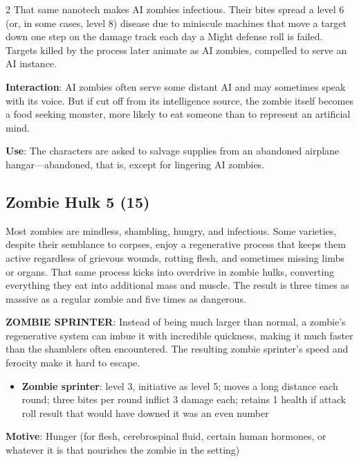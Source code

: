 \begin{multicols}{2}
That same nanotech makes AI zombies infectious. Their bites spread a level 6 (or, in some cases, level 8) disease due to miniscule machines that move a target down one step on the damage track each day a Might defense roll is failed. Targets killed by the process later animate as AI zombies, compelled to serve an AI instance. 

\textbf{Interaction}: AI zombies often serve some distant AI and may sometimes speak with its voice. But if cut off from its intelligence source, the zombie itself becomes a food seeking monster, more likely to eat someone than to represent an artificial mind. 

\textbf{Use}: The characters are asked to salvage supplies from an abandoned airplane hangar—abandoned, that is, except for lingering AI zombies.

\subsection{Zombie Hulk 5 (15)}

Most zombies are mindless, shambling, hungry, and infectious. Some varieties, despite their semblance to corpses, enjoy a regenerative process that keeps them active regardless of grievous wounds, rotting flesh, and sometimes missing limbs or organs. That same process kicks into overdrive in zombie hulks, converting everything they eat into additional mass and muscle. The result is three times as massive as a regular zombie and five times as dangerous.

\textbf{ZOMBIE SPRINTER}: Instead of being much larger than normal, a zombie’s regenerative system can imbue it with incredible quickness, making it much faster than the shamblers often encountered. The resulting zombie sprinter’s speed and ferocity make it hard to escape.

\begin{itemize}
\item \textbf{Zombie sprinter}: level 3, initiative as level 5; moves a long distance each round; three bites per round inflict 3 damage each; retains 1 health if attack roll result that would have downed it was an even number
\end{itemize} 
 
\textbf{Motive}: Hunger (for flesh, cerebrospinal fluid, certain human hormones, or whatever it is that nourishes the zombie in the setting) 


\end{multicols}
